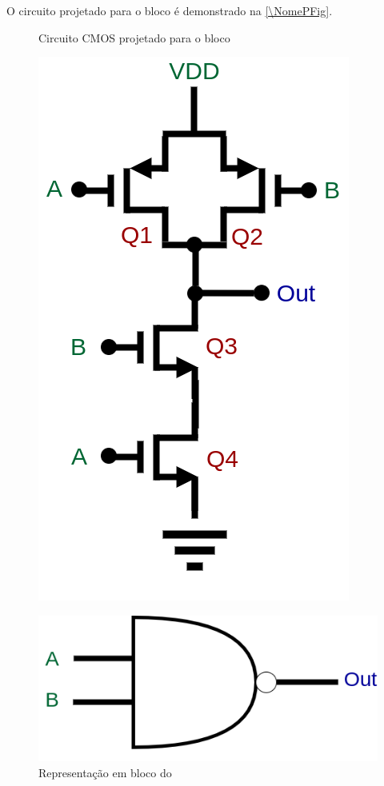 O circuito projetado para o bloco \'e demonstrado na \autoref{\NomePFig}.

\begin{figure}[htbp]
 \label{NomePFig}
 \centering
  \begin{minipage}{0.4\textwidth}
    \centering
    \caption{Circuito CMOS projetado para o bloco \NomeBloco} \label{\NomePFig}
    \includegraphics[scale=0.3]{Circuitos/NAND.png}
  \end{minipage}
  \hfill
  \begin{minipage}{0.4\textwidth}
    \centering
    \caption{Representa{\c c}\~ao em bloco do \NomeBlocoNoIt} \label{NomeSFig}
    \includegraphics[scale=0.3]{Circuitos/NAND_block.png}
  \end{minipage}
\end{figure}
\clearpage